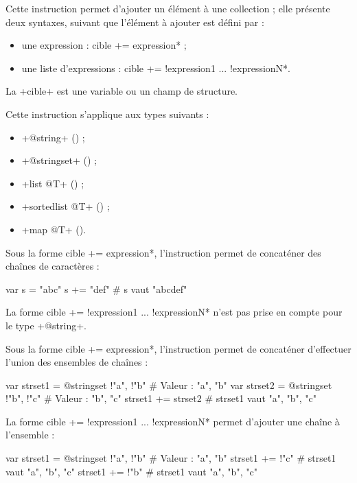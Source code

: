 Cette instruction permet d'ajouter un élément à une collection ; elle présente deux syntaxes, suivant que l'élément à ajouter est défini par :
\begin{itemize}
  \item une expression : \ggs*cible += expression* ;
  \item une liste d'expressions : \ggs*cible += !expression1 ... !expressionN*.
\end{itemize}


La \ggs+cible+ est une variable ou un champ de structure.

Cette instruction s'applique aux types suivants :
\begin{itemize}
  \item \ggs+@string+ () ;
  \item \ggs+@stringset+ () ;
  \item \ggs+list @T+ () ;
  \item \ggs+sortedlist @T+ () ;
  \item \ggs+map @T+ ().
\end{itemize}



Sous la forme \ggs*cible += expression*, l'instruction permet de concaténer des chaînes de caractères :
\begin{galgas}
var s = "abc"
s += "def" # s vaut "abcdef"
\end{galgas}

La forme \ggs*cible += !expression1 ... !expressionN* n'est pas prise en compte pour le type \ggs+@string+.




Sous la forme \ggs*cible += expression*, l'instruction permet de concaténer d'effectuer l'union des ensembles de chaînes :
\begin{galgas}
var strset1 = @stringset {!"a", !"b"} # Valeur : "a", "b"
var strset2 = @stringset {!"b", !"c"} # Valeur : "b", "c"
strset1 += strset2 # strset1 vaut "a", "b", "c"
\end{galgas}

La forme \ggs*cible += !expression1 ... !expressionN* permet d'ajouter une chaîne à l'ensemble :
\begin{galgas}
var strset1 = @stringset {!"a", !"b"} # Valeur : "a", "b"
strset1 += !"c" # strset1 vaut "a", "b", "c"
strset1 += !"b" # strset1 vaut "a", "b", "c"
\end{galgas}



